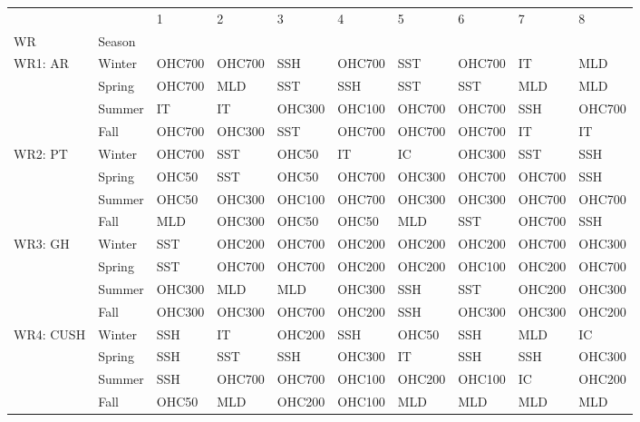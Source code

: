 \begin{tabular}{llllllllll}
\toprule
          &      &       1 &       2 &       3 &       4 &       5 &       6 &       7 &       8 \\
WR & Season &         &         &         &         &         &         &         &         \\
\midrule
WR1: AR & Winter &  OHC700 &  OHC700 &     SSH &  OHC700 &     SST &  OHC700 &      IT &     MLD \\
          & Spring &  OHC700 &     MLD &     SST &     SSH &     SST &     SST &     MLD &     MLD \\
          & Summer &      IT &      IT &  OHC300 &  OHC100 &  OHC700 &  OHC700 &     SSH &  OHC700 \\
          & Fall &  OHC700 &  OHC300 &     SST &  OHC700 &  OHC700 &  OHC700 &      IT &      IT \\
WR2: PT & Winter &  OHC700 &     SST &   OHC50 &      IT &      IC &  OHC300 &     SST &     SSH \\
          & Spring &   OHC50 &     SST &   OHC50 &  OHC700 &  OHC300 &  OHC700 &  OHC700 &     SSH \\
          & Summer &   OHC50 &  OHC300 &  OHC100 &  OHC700 &  OHC300 &  OHC300 &  OHC700 &  OHC700 \\
          & Fall &     MLD &  OHC300 &   OHC50 &   OHC50 &     MLD &     SST &  OHC700 &     SSH \\
WR3: GH & Winter &     SST &  OHC200 &  OHC700 &  OHC200 &  OHC200 &  OHC200 &  OHC700 &  OHC300 \\
          & Spring &     SST &  OHC700 &  OHC700 &  OHC200 &  OHC200 &  OHC100 &  OHC200 &  OHC700 \\
          & Summer &  OHC300 &     MLD &     MLD &  OHC300 &     SSH &     SST &  OHC200 &  OHC300 \\
          & Fall &  OHC300 &  OHC300 &  OHC700 &  OHC200 &     SSH &  OHC300 &  OHC300 &  OHC200 \\
WR4: CUSH & Winter &     SSH &      IT &  OHC200 &     SSH &   OHC50 &     SSH &     MLD &      IC \\
          & Spring &     SSH &     SST &     SSH &  OHC300 &      IT &     SSH &     SSH &  OHC300 \\
          & Summer &     SSH &  OHC700 &  OHC700 &  OHC100 &  OHC200 &  OHC100 &      IC &  OHC200 \\
          & Fall &   OHC50 &     MLD &  OHC200 &  OHC100 &     MLD &     MLD &     MLD &     MLD \\
\bottomrule
\end{tabular}
